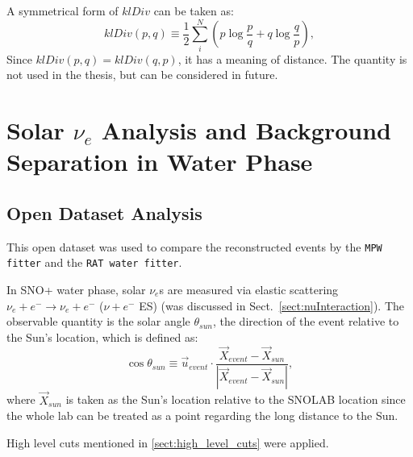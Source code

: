 A symmetrical form of $klDiv$ can be taken as:
\begin{equation}
klDiv(p,q) \equiv \frac{1}{2}\sum_{i}^N (p\log{\frac{p}{q}}+q\log{\frac{q}{p}}),
\end{equation}
Since $klDiv(p,q)=klDiv(q,p)$, it has a meaning of distance. The quantity is not used in the thesis, but can be considered in future.

\section{Solar \texorpdfstring{$\nu_e$}{Lg} Analysis and Background Separation in Water Phase}
\subsection{Open Dataset Analysis}
This open dataset was used to compare the reconstructed events by the \texttt{MPW fitter} and the \texttt{RAT water fitter}.

In SNO+ water phase, solar $\nu_e$s are measured via elastic scattering $\nu_e+e^-\to \nu_e+e^-$ ($\nu+e^-$ ES) (was discussed in Sect.~\ref{sect:nuInteraction}). The observable quantity is the solar angle $\theta_{sun}$, the direction of the event relative to the Sun's location, which is defined as:
\begin{equation}
\cos\theta_{sun}\equiv \vec u_{event}\cdot \frac{\vec{X}_{event}-\vec{X}_{sun}}{|\vec{X}_{event}-\vec{X}_{sun}|},
\end{equation}
where $\vec{X}_{sun}$ is taken as the Sun's location relative to the SNOLAB location since the whole lab can be treated as a point regarding the long distance to the Sun. 

High level cuts mentioned in \ref{sect:high_level_cuts} were applied.

